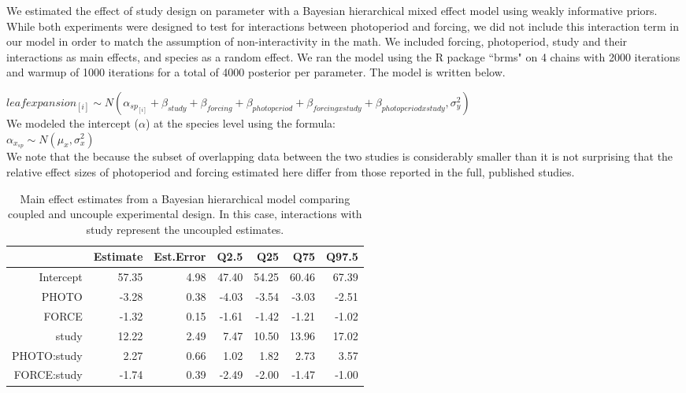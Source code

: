 \documentclass[11pt]{article}
\begin{document}
We estimated the effect of study design on parameter with a Bayesian hierarchical mixed effect model using weakly informative priors. While both experiments were designed to test for interactions between photoperiod and forcing, we did not include this interaction term in our model in order to match the assumption of non-interactivity in the math. We included forcing, photoperiod, study and their interactions as main effects, and species as a random effect. We ran the model using the R package ``brms" \citep{Burkner2018} on 4 chains with 2000 iterations and warmup of 1000 iterations for a total of 4000 posterior per parameter. The model is written below.

$leafexpansion_{[i]} \sim N(\alpha_{sp_{[i]}}+\beta_{study}+\beta_{forcing}+\beta_{photoperiod}+\beta_{forcing x study}+\beta_{photoperiod x study}, \sigma_y^2)$\\

 We modeled the intercept ($\alpha$) at the species level using the formula:\\

$\alpha_{x_{sp}} \sim N(\mu_x,\sigma^2_x)$\\

We note that the because the subset of overlapping data between the two studies is considerably smaller than it is not surprising that the relative effect sizes of photoperiod and forcing estimated here differ from those reported in the full, published studies.

\begin{table}[ht]
\centering
\begin{tabular}{rrrrrrr}
  \hline
 & Estimate & Est.Error & Q2.5 & Q25 & Q75 & Q97.5 \\ 
  \hline
Intercept & 57.35 & 4.98 & 47.40 & 54.25 & 60.46 & 67.39 \\ 
  PHOTO & -3.28 & 0.38 & -4.03 & -3.54 & -3.03 & -2.51 \\ 
  FORCE & -1.32 & 0.15 & -1.61 & -1.42 & -1.21 & -1.02 \\ 
  study & 12.22 & 2.49 & 7.47 & 10.50 & 13.96 & 17.02 \\ 
  PHOTO:study & 2.27 & 0.66 & 1.02 & 1.82 & 2.73 & 3.57 \\ 
  FORCE:study & -1.74 & 0.39 & -2.49 & -2.00 & -1.47 & -1.00 \\ 
   \hline
\end{tabular}
\label{tab:esty}
\caption{Main effect estimates from a Bayesian hierarchical model comparing coupled and uncouple experimental design. In this case, interactions with study represent the uncoupled estimates.}
\end{table}



\end{document}
